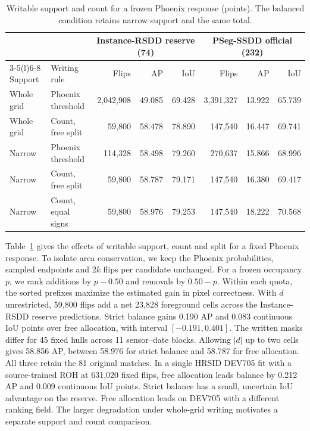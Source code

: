 \documentclass[journal]{IEEEtran}
\begin{document}
\begin{table}[t]
\centering
\caption{Writable support and count for a frozen Phoenix response (points). The balanced condition retains narrow support and the same total.}
\label{tab:phoenix-factors}
\footnotesize
\setlength{\tabcolsep}{5pt}
\begin{tabular}{@{}llrrr@{\quad}rrr@{}}
\toprule
 & & \multicolumn{3}{c}{Instance-RSDD reserve (74)} & \multicolumn{3}{c}{PSeg-SSDD official (232)}\\
\cmidrule(lr){3-5}\cmidrule(l){6-8}
Support & Writing rule & Flips & AP & IoU & Flips & AP & IoU\\
\midrule
Whole grid & Phoenix threshold & 2,042,908 & 49.085 & 69.428 & 3,391,327 & 13.922 & 65.739\\
Whole grid & Count, free split & 59,800 & 58.478 & 78.890 & 147,540 & 16.447 & 69.741\\
Narrow & Phoenix threshold & 114,328 & 58.498 & 79.260 & 270,637 & 15.866 & 68.996\\
Narrow & Count, free split & 59,800 & 58.787 & 79.171 & 147,540 & 16.380 & 69.417\\
Narrow & Count, equal signs & 59,800 & 58.976 & 79.253 & 147,540 & 18.222 & 70.568\\
\bottomrule
\end{tabular}
\end{table}

Table~\ref{tab:phoenix-factors} gives the effects of writable support, count and split for a fixed Phoenix response. To isolate area conservation, we keep the Phoenix probabilities, sampled endpoints and \(2k\) flips per candidate unchanged. For a frozen occupancy \(p\), we rank additions by \(p-0.50\) and removals by \(0.50-p\). Within each quota, the sorted prefixes maximize the estimated gain in pixel correctness. With \(d\) unrestricted, 59,800 flips add a net 23,828 foreground cells across the Instance-RSDD reserve predictions. Strict balance gains 0.190 AP and 0.083 continuous IoU points over free allocation, with interval \([-0.191,0.401]\). The written masks differ for 45 fixed hulls across 11 sensor--date blocks. Allowing \(|d|\) up to two cells gives 58.856 AP, between 58.976 for strict balance and 58.787 for free allocation. All three retain the 81 original matches. In a single HRSID DEV705 fit with a source-trained ROH at 631,020 fixed flips, free allocation leads balance by 0.212 AP and 0.009 continuous IoU points. Strict balance has a small, uncertain IoU advantage on the reserve. Free allocation leads on DEV705 with a different ranking field. The larger degradation under whole-grid writing motivates a separate support and count comparison.
\end{document}
